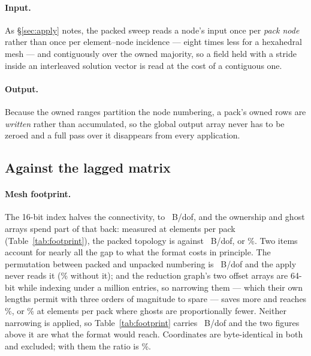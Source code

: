 \documentclass[sigconf,nonacm]{acmart}
\newcommand{\fostag}{\emph{First-order upwind.}}
\begin{document}
\paragraph{Input.} As \S\ref{sec:apply} notes, the packed sweep reads a node's input once per
\emph{pack node} rather than once per element--node incidence --- eight times less for a
hexahedral mesh --- and contiguously over the owned majority, so a field held with a stride
inside an interleaved solution vector is read at the cost of a contiguous one.

\paragraph{Output.} Because the owned ranges partition the node numbering, a pack's owned rows
are \emph{written} rather than accumulated, so the global output array never has to be zeroed
and a full pass over it disappears from every application.

\subsection{Against the lagged matrix}

\begin{table}[t]
  \centering
  \caption{\fostag{} Stored size per degree of freedom, excluding the solution and result
    vectors, which every representation carries alike. Mesh rows are measured array by array,
    assembled rows follow from the sparsity pattern. The matrix-free side also reads
    \SI{19.5}{\byte} of cached affine geometry per degree of freedom, which is not a mesh
    property and is charged in the roofline of \S\ref{sec:res:spmv} instead.}
  \label{tab:footprint}
  
\end{table}

\paragraph{Mesh footprint.} The
16-bit index halves the connectivity, \fpStd{} to \fpConn{}~B/dof, and the ownership and ghost
arrays spend part of that back: measured at \fpPack{} elements per pack
(Table~\ref{tab:footprint}), the packed topology is \fpImpl{} against \fpStd{}~B/dof, or
\fpImplPct{}\%. Two items account for nearly all the gap to what the format costs in principle.
The permutation between packed and unpacked numbering is \fpNodeMap{}~B/dof and the apply never
reads it (\fpWorkingPct{}\% without it); and the reduction graph's two offset arrays are 64-bit
while indexing under a million entries, so narrowing them --- which their own lengths permit
with three orders of magnitude to spare --- saves \fpReduceSaving{} more and reaches
\fpFloorPct{}\%, or \fpFloorBigPct{}\% at \fpPackBig{} elements per pack where ghosts are
proportionally fewer. Neither narrowing is applied, so Table~\ref{tab:footprint} carries
\fpImpl{}~B/dof and the two figures above it are what the format would reach.
Coordinates are byte-identical in both and excluded; with them the ratio is \fpImplPtsPct{}\%.
\end{document}
